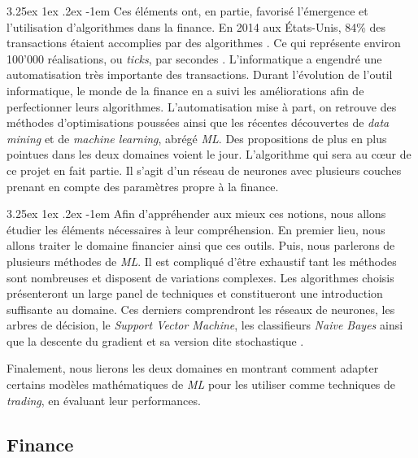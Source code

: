 \documentclass[a4paper, 11pt]{article}
\makeatletter
\renewcommand\paragraph{\@startsection{paragraph}{5}{\z@}%
  {3.25ex \@plus1ex \@minus.2ex}%
  {-1em}%
  {\normalfont\normalsize\bfseries}}
\makeatother
\begin{document}
\paragraph{}
Ces éléments ont, en partie, favorisé l'émergence et l'utilisation d'algorithmes dans la finance. 
En 2014 aux États-Unis, 84\% des transactions étaient accomplies par des algorithmes \cite{real_investors}. 
Ce qui représente environ 100'000 réalisations, ou \textit{ticks}, par secondes \cite{real_investors}. L'informatique a engendré une automatisation très importante des transactions.
Durant l'évolution de l'outil informatique, le monde de la finance en a suivi les améliorations afin de perfectionner 
leurs algorithmes. L'automatisation mise à part, on retrouve des méthodes d'optimisations poussées ainsi que les récentes découvertes 
de \textit{data mining} et de \textit{machine learning}, abrégé \textit{ML}. 
Des propositions de plus en plus pointues dans les deux domaines voient le jour. 
L'algorithme qui sera au cœur de ce projet en fait partie. 
Il s'agit d'un réseau de neurones avec plusieurs couches prenant en compte des paramètres propre à la finance.

\paragraph{}Afin d'appréhender aux mieux ces notions, nous allons étudier les éléments nécessaires à leur compréhension.
En premier lieu, nous allons traiter le domaine financier ainsi que ces outils. Puis, nous parlerons de 
plusieurs méthodes de \textit{ML}. Il est compliqué d'être exhaustif tant les méthodes sont nombreuses et disposent de variations complexes. Les algorithmes choisis présenteront un large panel de techniques et constitueront une introduction suffisante au domaine. Ces derniers comprendront les réseaux de neurones, les arbres de décision, le \textit{Support Vector Machine}\cite{wikipedia_svm}, les classifieurs \textit{Naive Bayes} ainsi que la descente du gradient \cite{wikipedia_descente_du_gradient} et sa version dite stochastique \cite{descente_du_gradient_stochastique}.


Finalement, nous lierons les deux domaines en montrant comment adapter certains modèles mathématiques de \textit{ML} pour les utiliser comme techniques de \textit{trading}, en évaluant leur performances.


\subsection{Finance}
\end{document}

